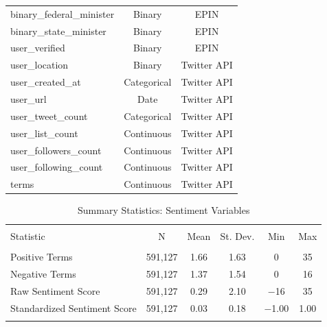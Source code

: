 \documentclass[a4paper,11pt]{article}
\begin{document}
\begin{table}[H]
\begin{center}
{\begin{tabularx}{\textwidth}{LCC}
        binary\_federal\_minister & Binary & EPIN \\
        binary\_state\_minister & Binary & EPIN \\
        user\_verified & Binary & EPIN \\
        user\_location & Binary & Twitter API \\
        user\_created\_at & Categorical & Twitter API \\
        user\_url & Date & Twitter API \\
        user\_tweet\_count & Categorical & Twitter API \\
        user\_list\_count & Continuous & Twitter API \\
        user\_followers\_count & Continuous & Twitter API \\
        user\_following\_count & Continuous & Twitter API \\
        terms & Continuous & Twitter API \\
        \hline \hline
        \end{tabularx}}
    \end{center}
\end{table}
\newpage
\begin{table}[!htb]
    \centering
    \caption{Summary Statistics: Sentiment Variables}
    \label{tab:sumstats}
\begin{tabular}{@{\extracolsep{5pt}}lccccc} 
\\[-1.8ex]\hline 
\hline \\[-1.8ex] 
Statistic & \multicolumn{1}{c}{N} & \multicolumn{1}{c}{Mean} & \multicolumn{1}{c}{St. Dev.} & \multicolumn{1}{c}{Min} & \multicolumn{1}{c}{Max} \\ 
\hline \\[-1.8ex] 
Positive Terms & 591,127 & 1.66 & 1.63 & 0 & 35 \\ 
Negative Terms & 591,127 & 1.37 & 1.54 & 0 & 16 \\ 
Raw Sentiment Score & 591,127 & 0.29 & 2.10 & $-$16 & 35 \\ 
Standardized Sentiment Score & 591,127 & 0.03 & 0.18 & $-$1.00 & 1.00 \\ 
\hline \\[-1.8ex] 
\end{tabular} 
\end{table}
\newpage
\end{document}
